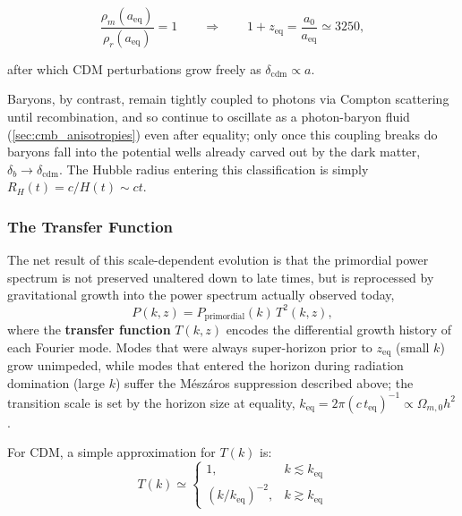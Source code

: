 \begin{minipage}{0.6\textwidth}
    $$
    \frac{\rho_m(a_{\text{eq}})}{\rho_r(a_{\text{eq}})} = 1
    \qquad \Rightarrow \qquad
    1 + z_{\text{eq}} = \frac{a_0}{a_{\text{eq}}} \simeq 3250 ,
    $$

    after which CDM perturbations grow freely as $\delta_{\text{cdm}} \propto a$.
    
    \smallskip
    
    Baryons, by contrast, remain tightly coupled to photons via Compton scattering until recombination, and so continue to oscillate as a photon-baryon fluid (\cref{sec:cmb_anisotropies}) even after equality; only once this coupling breaks do baryons fall into the potential wells already carved out by the dark matter, $\delta_b \to \delta_{\text{cdm}}$. The Hubble radius entering this classification is simply $R_H(t) = c/H(t) \sim ct$.

    \subsubsection{The Transfer Function} \label{subsubsec:transfer_function}

    The net result of this scale-dependent evolution is that the primordial power spectrum is not preserved unaltered down to late times, but is reprocessed by gravitational growth into the power spectrum actually observed today,
    $$
    P(k,z) = P_{\text{primordial}}(k)\, T^2(k,z) ,
    $$
    where the \textbf{transfer function} $T(k,z)$ encodes the differential growth history of each Fourier mode. Modes that were always super-horizon prior to $z_{\text{eq}}$ (small $k$) grow unimpeded, while modes that entered the horizon during radiation domination (large $k$) suffer the Mészáros suppression described above; the transition scale is set by the horizon size at equality, $k_{\text{eq}} = 2\pi (c\,t_{\text{eq}})^{-1} \propto \Omega_{m,0} h^2$.

    \smallskip

    For CDM, a simple approximation for $T(k)$ is:
    $$
    T(k) \simeq
    \begin{cases}
    1 , & k \lesssim k_{\text{eq}} \\
    (k/k_{\text{eq}})^{-2} , & k \gtrsim k_{\text{eq}}
    \end{cases}
    $$
\end{minipage}%
\hfill
